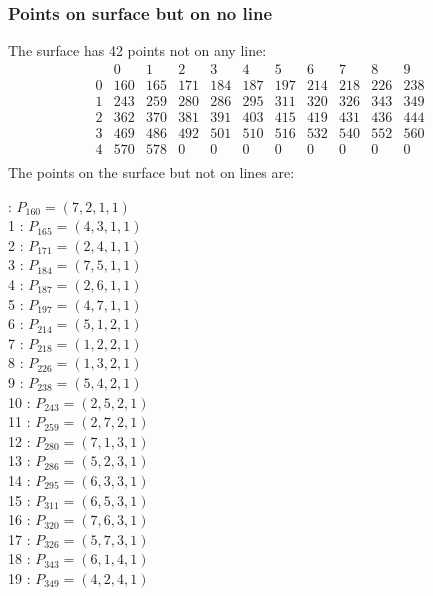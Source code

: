 \documentclass{article}
\begin{document}
{\subsubsection*{Points on surface but on no line}
The surface has 42 points not on any line:\\
$$
\begin{array}{r|*{10}{r}}
 & 0 & 1 & 2 & 3 & 4 & 5 & 6 & 7 & 8 & 9\\
\hline
0 & 160 & 165 & 171 & 184 & 187 & 197 & 214 & 218 & 226 & 238\\
1 & 243 & 259 & 280 & 286 & 295 & 311 & 320 & 326 & 343 & 349\\
2 & 362 & 370 & 381 & 391 & 403 & 415 & 419 & 431 & 436 & 444\\
3 & 469 & 486 & 492 & 501 & 510 & 516 & 532 & 540 & 552 & 560\\
4 & 570 & 578 & 0 & 0 & 0 & 0 & 0 & 0 & 0 & 0\\
\end{array}
$$
The points on the surface but not on lines are:\\
\begin{multicols}{2}
 : $P_{160}=( 7, 2, 1, 1 )$\\
1 : $P_{165}=( 4, 3, 1, 1 )$\\
2 : $P_{171}=( 2, 4, 1, 1 )$\\
3 : $P_{184}=( 7, 5, 1, 1 )$\\
4 : $P_{187}=( 2, 6, 1, 1 )$\\
5 : $P_{197}=( 4, 7, 1, 1 )$\\
6 : $P_{214}=( 5, 1, 2, 1 )$\\
7 : $P_{218}=( 1, 2, 2, 1 )$\\
8 : $P_{226}=( 1, 3, 2, 1 )$\\
9 : $P_{238}=( 5, 4, 2, 1 )$\\
10 : $P_{243}=( 2, 5, 2, 1 )$\\
11 : $P_{259}=( 2, 7, 2, 1 )$\\
12 : $P_{280}=( 7, 1, 3, 1 )$\\
13 : $P_{286}=( 5, 2, 3, 1 )$\\
14 : $P_{295}=( 6, 3, 3, 1 )$\\
15 : $P_{311}=( 6, 5, 3, 1 )$\\
16 : $P_{320}=( 7, 6, 3, 1 )$\\
17 : $P_{326}=( 5, 7, 3, 1 )$\\
18 : $P_{343}=( 6, 1, 4, 1 )$\\
19 : $P_{349}=( 4, 2, 4, 1 )$\\

\end{multicols}}
\end{document}

